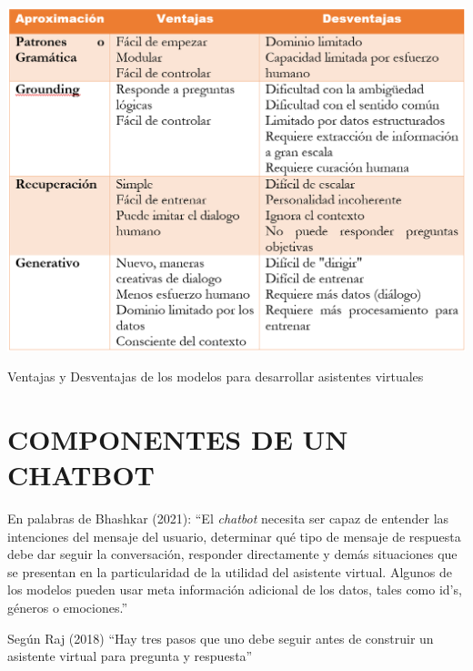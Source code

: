 \documentclass[letter, openright, 12pt]{book}
\begin{document}
\begin{table}[!ht]
\includegraphics[width=1\textwidth]{tabla2_1}
\caption{Ventajas y Desventajas de los modelos para desarrollar asistentes virtuales}
\label{tab:tabla2_1} 
\end{table}

\section{COMPONENTES DE UN CHATBOT}
En palabras de Bhashkar (2021): “El \textit{chatbot} necesita ser capaz de entender las intenciones del mensaje del usuario, determinar qué tipo de mensaje de respuesta debe dar seguir la conversación, responder directamente y demás situaciones que se presentan en la particularidad de la utilidad del asistente virtual. Algunos de los modelos pueden usar meta información adicional de los datos, tales como id’s, géneros o emociones.”
\par
Según Raj (2018) “Hay tres pasos que uno debe seguir antes de construir un asistente virtual para pregunta y respuesta” 
\end{document}
